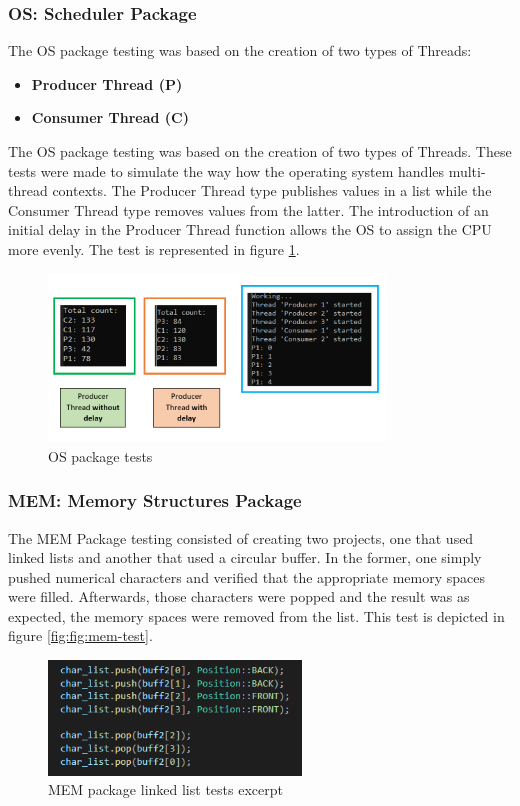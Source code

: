 \subsubsection{OS: Scheduler Package}
%
The OS package testing was based on the creation of two types of Threads:
\begin{itemize}
	\item \textbf{Producer Thread (P)}
	\item \textbf{Consumer Thread (C)}
\end{itemize}
%
The OS package testing was based on the creation of two types of Threads. These tests were made to simulate the way how the operating system handles multi-thread contexts. The Producer Thread type publishes values in a list while the Consumer Thread type removes values from the latter. The introduction of an initial delay in the Producer Thread function allows the OS to assign the CPU more evenly.
The test is represented in figure \ref{fig:os-test}.
%
\begin{figure}[!ht]
\centering
\includegraphics[width=0.8\textwidth]{img/OS-threads.png}
\caption{\label{fig:os-test}OS package tests}
\end{figure}
%
\subsubsection{MEM: Memory Structures Package}
%
The MEM Package testing consisted of creating two projects, one that used linked lists and another that used a circular buffer. In the former, one simply pushed numerical characters and verified that the appropriate memory spaces were filled. Afterwards, those characters were popped and the result was as expected, the memory spaces were removed from the list. This test is depicted in figure \ref{fig:fig:mem-test}.
%
\begin{figure}[!ht]
\centering
\includegraphics[width=0.6\textwidth]{img/MEM-linked-list.png}
\caption{\label{fig:mem-test}MEM package linked list tests excerpt}
\end{figure}
%
%
